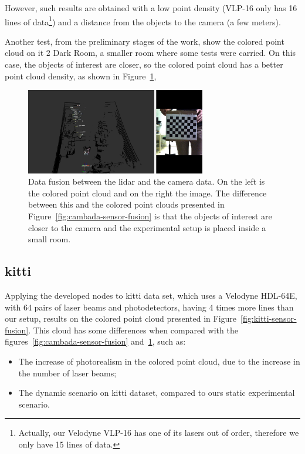 However, such results are obtained with a low point density (VLP-16 only has 16 lines of data\footnote{Actually, our Velodyne VLP-16 has one of its lasers out of order, therefore we only have 15 lines of data.}) and a distance from the objects to the camera (a few meters). 

Another test, from the preliminary stages of the work, show the colored point cloud on \ac{it} 2 Dark Room, a smaller room where some tests were carried. On this case, the objects of interest are closer, so the colored point cloud has a better point cloud density, as shown in Figure~\ref{fig:dark-room-sensor-fusion}, 

\begin{figure}[!ht]
	\centering
	\includegraphics[width=0.7\textwidth]{img/sensor_fusion/dark-room-sensor-fusion.png}
\caption[Example of preliminar data fusion on \acs{it} 2 Dark Room.]{Data fusion between the \ac{lidar} and the camera data. On the left is the colored point cloud and on the right the image. The difference between this and the colored point clouds presented in Figure~\ref{fig:cambada-sensor-fusion} is that the objects of interest are closer to the camera and the experimental setup is placed inside a small room.}
	\label{fig:dark-room-sensor-fusion}
\end{figure}

\subsection{\ac{kitti}}
\label{subsec:sensor-fusion:kitti}
Applying the developed nodes to \ac{kitti} data set, which uses a Velodyne HDL-64E, with 64 pairs of laser beams and photodetectors, having 4 times more lines than our setup, results on the colored point cloud presented in Figure~\ref{fig:kitti-sensor-fusion}. This cloud has some differences when compared with the figures~\ref{fig:cambada-sensor-fusion} and~\ref{fig:dark-room-sensor-fusion}, such as:

\begin{itemize}
	\item The increase of photorealism in the colored point cloud, due to the increase in the number of laser beams;
	\item The dynamic scenario on \ac{kitti} dataset, compared to ours static experimental scenario.
\end{itemize}


